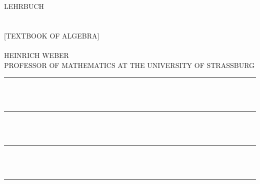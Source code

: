 \begin{center}
{\Huge LEHRBUCH}\\[3ex]
{\small {}}\\[3ex]
{\Huge {}}\\[1ex]
{\large [TEXTBOOK OF ALGEBRA]}\\[5ex]
{\small {}}\\[3ex]
{\LARGE HEINRICH WEBER}\\[0.5ex]
{\small PROFESSOR OF MATHEMATICS AT THE UNIVERSITY OF STRASSBURG}\\[4ex]
\rule{2cm}{0.4pt}\\[6ex]
{\Large \textbf{}}\\[6ex]
\rule{2cm}{0.4pt}\\[6ex]
{\Large {}}\\[2ex]
\rule{1.5cm}{0.4pt}\\[2ex]
{\small {}}\\[10ex]
\rule{\textwidth}{1pt}\\[4ex]
{\large {}}\\[1ex]
{\small {}}\\[1ex]
{\large {}}
\end{center}
